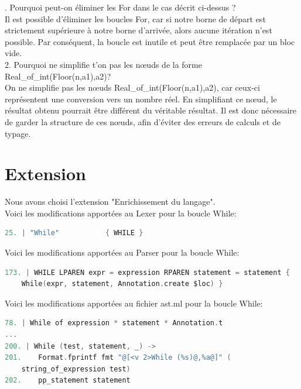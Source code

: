 \documentclass{report}
\begin{document}
    . Pourquoi peut-on éliminer les For dans le cas décrit ci-dessus ? \\

    Il est possible d'éliminer les boucles For, car si notre borne de départ est strictement supérieure à notre borne d'arrivée, alors aucune itération n'est possible. Par conséquent, la boucle est inutile et peut être remplacée par un bloc vide. \\

    2. Pourquoi ne simplifie t'on pas les nœuds de la forme Real\_of\_int(Floor(n,a1),a2)? \\

    On ne simplifie pas les nœuds Real\_of\_int(Floor(n,a1),a2), car ceux-ci représentent une conversion vers un nombre réel. En simplifiant ce nœud, le résultat obtenu pourrait être différent du véritable résultat. Il est donc nécessaire de garder la structure de ces nœuds, afin d'éviter des erreurs de calculs et de typage.\\

    \section{Extension}

    Nous avons choisi l'extension "Enrichissement du langage".\\

    Voici les modifications apportées au Lexer pour la boucle While: \\

    \begin{lstlisting}[language=C, basicstyle=\ttfamily]
25. | "While"           { WHILE }
    \end{lstlisting}

    Voici les modifications apportées au Parser pour la boucle While: \\

    \begin{lstlisting}[language=C, basicstyle=\ttfamily]
173. | WHILE LPAREN expr = expression RPAREN statement = statement {
    While(expr, statement, Annotation.create $loc) }
    \end{lstlisting}

    Voici les modifications apportées au fichier ast.ml pour la boucle While: \\

    \begin{lstlisting}[language=C, basicstyle=\ttfamily]
78. | While of expression * statement * Annotation.t
...
200. | While (test, statement, _) ->
201.    Format.fprintf fmt "@[<v 2>While (%s)@,%a@]" (
    string_of_expression test)
202.    pp_statement statement
    \end{lstlisting}
\end{document}
